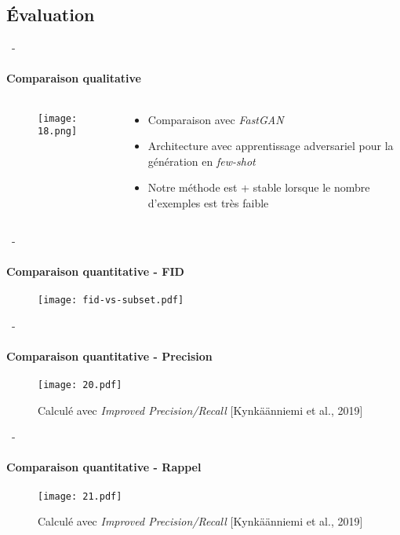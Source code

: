 \documentclass[aspectratio=169, 22pt]{beamer}
\begin{document}
\subsection{Évaluation}
\begin{frame}{\secname~- \subsecname}
  \framesubtitle{Comparaison qualitative}
  \begin{columns}
    \begin{column}{0.55\linewidth}
      \begin{figure}
        \texttt{[image: 18.png]}
      \end{figure}
    \end{column}
    \begin{column}{0.45\linewidth}
      \begin{itemize}
      \item Comparaison avec \emph{FastGAN}
      \item Architecture avec apprentissage adversariel pour la génération en \emph{few-shot}
      \item Notre méthode est + stable lorsque le nombre d'exemples est très faible
      \end{itemize}
    \end{column}
  \end{columns}  
\end{frame}

\begin{frame}{\secname~- \subsecname}
  \framesubtitle{Comparaison quantitative - FID}
  \begin{figure}
    \texttt{[image: fid-vs-subset.pdf]}
  \end{figure}
\end{frame}

\begin{frame}{\secname~- \subsecname}
  \framesubtitle{Comparaison quantitative - Precision}
  \begin{figure}
    \texttt{[image: 20.pdf]}
    \caption{\small Calculé avec \emph{Improved Precision/Recall} [Kynkäänniemi et al., 2019]}
  \end{figure}
\end{frame}

\begin{frame}{\secname~- \subsecname}
  \framesubtitle{Comparaison quantitative - Rappel}
  \begin{figure}
    \texttt{[image: 21.pdf]}
    \caption{\small Calculé avec \emph{Improved Precision/Recall} [Kynkäänniemi et al., 2019]}
  \end{figure}
\end{frame}
\end{document}
